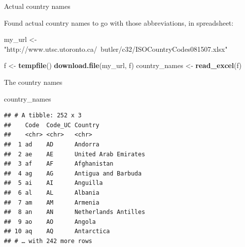 \documentclass[ignorenonframetext,]{beamer}
\newenvironment{Shaded}{\begin{snugshade}}{\end{snugshade}}
\newcommand{\KeywordTok}[1]{\textcolor[rgb]{0.13,0.29,0.53}{\textbf{#1}}}
\newcommand{\NormalTok}[1]{#1}
\newcommand{\StringTok}[1]{\textcolor[rgb]{0.31,0.60,0.02}{#1}}
\begin{document}
\begin{frame}[fragile]{Actual country names}
\protect\hypertarget{actual-country-names}{}

Found actual country names to go with those abbreviations, in
spreadsheet:

\footnotesize

\begin{Shaded}
\begin{Highlighting}[]
\NormalTok{my_url <-}\StringTok{ }
\StringTok{  "http://www.utsc.utoronto.ca/~butler/c32/ISOCountryCodes081507.xlsx"}
\end{Highlighting}
\end{Shaded}

\normalsize

\begin{Shaded}
\begin{Highlighting}[]
\NormalTok{f <-}\StringTok{ }\KeywordTok{tempfile}\NormalTok{()}
\KeywordTok{download.file}\NormalTok{(my_url, f)}
\NormalTok{country_names <-}\StringTok{ }\KeywordTok{read_excel}\NormalTok{(f)}
\end{Highlighting}
\end{Shaded}

\end{frame}

\begin{frame}[fragile]{The country names}
\protect\hypertarget{the-country-names}{}

\begin{Shaded}
\begin{Highlighting}[]
\NormalTok{country_names}
\end{Highlighting}
\end{Shaded}

\begin{verbatim}
## # A tibble: 252 x 3
##    Code  Code_UC Country             
##    <chr> <chr>   <chr>               
##  1 ad    AD      Andorra             
##  2 ae    AE      United Arab Emirates
##  3 af    AF      Afghanistan         
##  4 ag    AG      Antigua and Barbuda 
##  5 ai    AI      Anguilla            
##  6 al    AL      Albania             
##  7 am    AM      Armenia             
##  8 an    AN      Netherlands Antilles
##  9 ao    AO      Angola              
## 10 aq    AQ      Antarctica          
## # … with 242 more rows
\end{verbatim}

\end{frame}
\end{document}
